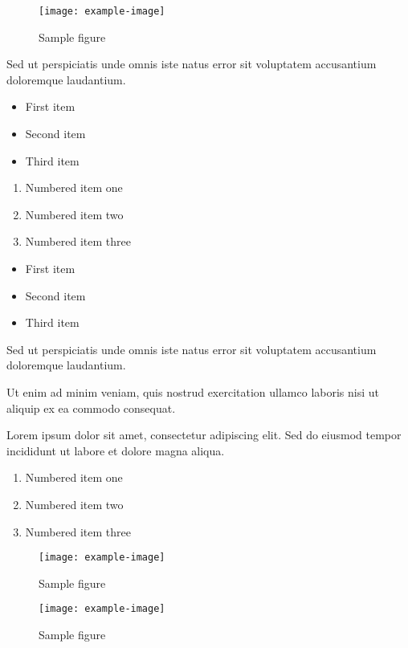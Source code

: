 \documentclass{article}
\begin{document}
\begin{figure}[h]
    \centering
    \texttt{[image: example-image]}
    \caption{Sample figure}
    \label{fig:sample}
\end{figure}

Sed ut perspiciatis unde omnis iste natus error sit voluptatem accusantium doloremque laudantium.

\begin{itemize}
\item First item
\item Second item
\item Third item
\end{itemize}

\begin{enumerate}
\item Numbered item one
\item Numbered item two
\item Numbered item three
\end{enumerate}

\begin{itemize}
\item First item
\item Second item
\item Third item
\end{itemize}

Sed ut perspiciatis unde omnis iste natus error sit voluptatem accusantium doloremque laudantium.

Ut enim ad minim veniam, quis nostrud exercitation ullamco laboris nisi ut aliquip ex ea commodo consequat.

Lorem ipsum dolor sit amet, consectetur adipiscing elit. Sed do eiusmod tempor incididunt ut labore et dolore magna aliqua.


\begin{enumerate}
\item Numbered item one
\item Numbered item two
\item Numbered item three
\end{enumerate}


\begin{figure}[h]
    \centering
    \texttt{[image: example-image]}
    \caption{Sample figure}
    \label{fig:sample}
\end{figure}

\begin{figure}[h]
    \centering
    \texttt{[image: example-image]}
    \caption{Sample figure}
    \label{fig:sample}
\end{figure}
\end{document}
